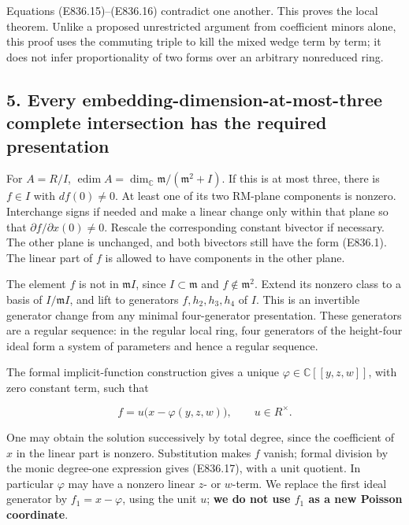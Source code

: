 Equations (E836.15)--(E836.16) contradict one another. This proves the
local theorem. Unlike a proposed unrestricted argument from coefficient
minors alone, this proof uses the commuting triple to kill the mixed
wedge term by term; it does not infer proportionality of two forms over
an arbitrary nonreduced ring.

\subsection{5. Every embedding-dimension-at-most-three complete
intersection has the required
presentation}\label{SF-E836:every-embedding-dimension-at-most-three-complete-intersection-has-the-required-presentation}

For \(A=R/I\),
\(\operatorname{edim}A=\dim_{\mathbb C}\mathfrak m/(\mathfrak m^2+I)\).
If this is at most three, there is \(f\in I\) with \(df(0)\ne0\). At
least one of its two RM-plane components is nonzero. Interchange signs
if needed and make a linear change only within that plane so that
\(\partial f/\partial x(0)\ne0\). Rescale the corresponding constant
bivector if necessary. The other plane is unchanged, and both bivectors
still have the form (E836.1). The linear part of \(f\) is allowed to
have components in the other plane.

The element \(f\) is not in \(\mathfrak m I\), since
\(I\subset\mathfrak m\) and \(f\notin\mathfrak m^2\). Extend its nonzero
class to a basis of \(I/\mathfrak m I\), and lift to generators
\(f,h_2,h_3,h_4\) of \(I\). This is an invertible generator change from
any minimal four-generator presentation. These generators are a regular
sequence: in the regular local ring, four generators of the height-four
ideal form a system of parameters and hence a regular sequence.

The formal implicit-function construction gives a unique
\(\varphi\in\mathbb C[[y,z,w]]\), with zero constant term, such that

\[
 f=u\bigl(x-\varphi(y,z,w)\bigr),\qquad u\in R^\times.
 \tag{E836.17}
\]

One may obtain the solution successively by total degree, since the
coefficient of \(x\) in the linear part is nonzero. Substitution makes
\(f\) vanish; formal division by the monic degree-one expression gives
(E836.17), with a unit quotient. In particular \(\varphi\) may have a
nonzero linear \(z\)- or \(w\)-term. We replace the first ideal
generator by \(f_1=x-\varphi\), using the unit \(u\); \textbf{we do not
use \(f_1\) as a new Poisson coordinate}.


